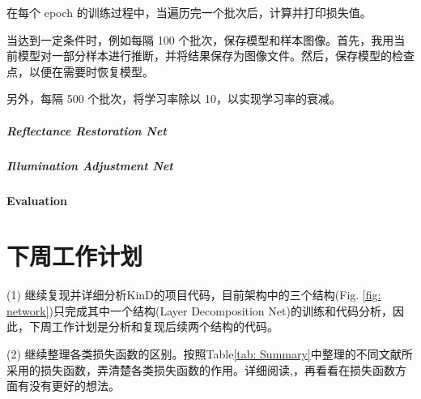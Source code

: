 \documentclass[letterpaper,12pt]{article}
\begin{document}
			在每个 epoch 的训练过程中，当遍历完一个批次后，计算并打印损失值。
			
			当达到一定条件时，例如每隔 100 个批次，保存模型和样本图像。首先，我用当前模型对一部分样本进行推断，并将结果保存为图像文件。然后，保存模型的检查点，以便在需要时恢复模型。
			
			另外，每隔 500 个批次，将学习率除以 10，以实现学习率的衰减。
		
			\subparagraph{Reflectance Restoration Net}
		
			\subparagraph{Illumination Adjustment Net}
		
			\paragraph{Evaluation}
		

			

		
	\section{下周工作计划}

	(1) 继续复现并详细分析KinD的项目代码，目前架构中的三个结构(Fig. \ref{fig: network})只完成其中一个结构(Layer Decomposition Net)的训练和代码分析，因此，下周工作计划是分析和复现后续两个结构的代码。

	(2) 继续整理各类损失函数的区别。按照Table\ref{tab: Summary}中整理的不同文献所采用的损失函数，弄清楚各类损失函数的作用。详细阅读\cite{fang2020perceptual},\cite{talebi2018nima}，再看看在损失函数方面有没有更好的想法。
	
	
	
	
\end{document}
